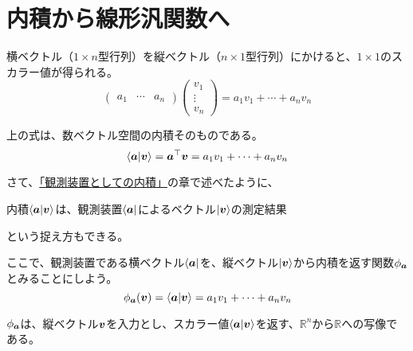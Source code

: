 \documentclass[../../../topic_linear-algebra]{subfiles}
\begin{document}
\sectionline
\section{内積から線形汎関数へ}\label{sec:inner-product-to-functional}

横ベクトル（$1 \times n$型行列）を縦ベクトル（$n \times 1$型行列）にかけると、$1 \times 1$のスカラー値が得られる。
\begin{equation*}
  \begin{pmatrix}
    a_1 & \cdots & a_n
  \end{pmatrix} \begin{pmatrix}
    v_1    \\
    \vdots \\
    v_n
  \end{pmatrix}
  = a_1 v_1 + \cdots + a_n v_n
\end{equation*}

上の式は、数ベクトル空間の内積そのものである。
\begin{equation*}
  \braket{\vb*{a}|\vb*{v}} = \vb*{a}^\top\vb*{v} = a_1 v_1 + \cdots + a_n v_n
\end{equation*}

\br

さて、\hyperref[sec:inner-product-as-observer]{「観測装置としての内積」}の章で述べたように、
\begin{emphabox}
  \begin{spacebox}
    \begin{center}
      内積$\braket{\vb*{a}|\vb*{v}}$は、観測装置$\bra{\vb*{a}}$によるベクトル$\ket{\vb*{v}}$の測定結果
    \end{center}
  \end{spacebox}
\end{emphabox}
という捉え方もできる。

\br

ここで、観測装置である横ベクトル$\bra{\vb*{a}}$を、縦ベクトル$\ket{\vb*{v}}$から内積を返す関数$\phi_{\vb*{a}}$とみることにしよう。
\begin{equation*}
  \phi_{\vb*{a}}(\vb*{v}) = \braket{\vb*{a}|\vb*{v}} = a_1 v_1 + \cdots + a_n v_n
\end{equation*}

$\phi_{\vb*{a}}$は、縦ベクトル$\vb*{v}$を入力とし、スカラー値$\braket{\vb*{a}|\vb*{v}}$を返す、$\mathbb{R}^n$から$\mathbb{R}$への写像である。

\br
\end{document}
